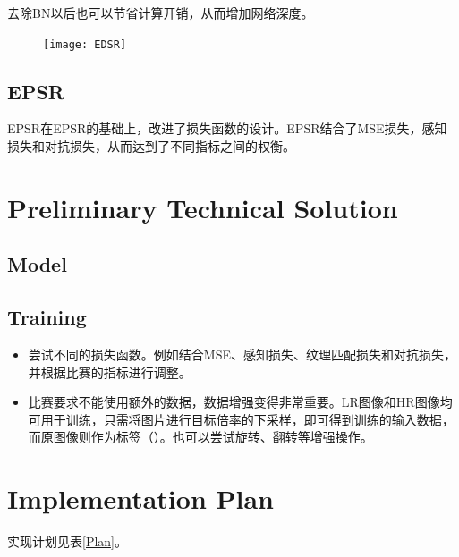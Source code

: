 \documentclass{article}
\begin{document}
去除BN以后也可以节省计算开销，从而增加网络深度。
\begin{figure}
	\centering
	\texttt{[image: EDSR]}
	\caption{}
	\label{fig:edsr}
\end{figure}

\subsection{EPSR}
EPSR\cite{EPSR}在EPSR的基础上，改进了损失函数的设计。EPSR结合了MSE损失，感知损失和对抗损失，从而达到了不同指标之间的权衡。

\section{Preliminary Technical Solution }
\subsection{Model}

\subsection{Training}
\begin{itemize}
	\item 尝试不同的损失函数。例如结合MSE、感知损失、纹理匹配损失和对抗损失，并根据比赛的指标进行调整。
	\item 比赛要求不能使用额外的数据，数据增强变得非常重要。LR图像和HR图像均可用于训练，只需将图片进行目标倍率的下采样，即可得到训练的输入数据，而原图像则作为标签（\cite{ZSSR}）。也可以尝试旋转、翻转等增强操作。
\end{itemize}

\section{Implementation Plan}
实现计划见表\ref{Plan}。
\end{document}
